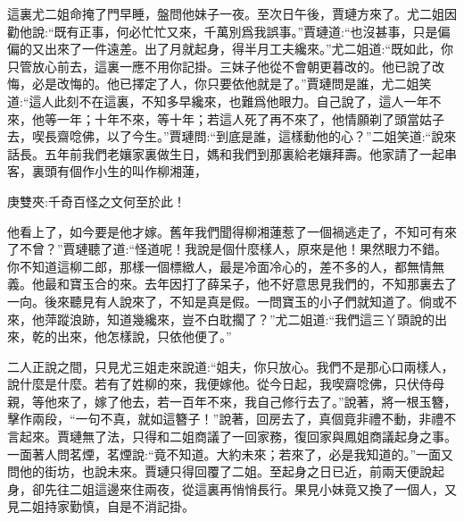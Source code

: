 \begin{parag}
    這裏尤二姐命掩了門早睡，盤問他妹子一夜。至次日午後，賈璉方來了。尤二姐因勸他說:“既有正事，何必忙忙又來，千萬別爲我誤事。”賈璉道:“也沒甚事，只是偏偏的又出來了一件遠差。出了月就起身，得半月工夫纔來。”尤二姐道:“既如此，你只管放心前去，這裏一應不用你記掛。三妹子他從不會朝更暮改的。他已說了改悔，必是改悔的。他已擇定了人，你只要依他就是了。”賈璉問是誰，尤二姐笑道:“這人此刻不在這裏，不知多早纔來，也難爲他眼力。自己說了，這人一年不來，他等一年；十年不來，等十年；若這人死了再不來了，他情願剃了頭當姑子去，喫長齋唸佛，以了今生。”賈璉問:“到底是誰，這樣動他的心？”二姐笑道:“說來話長。五年前我們老孃家裏做生日，媽和我們到那裏給老孃拜壽。他家請了一起串客，裏頭有個作小生的叫作柳湘蓮，\begin{note}庚雙夾:千奇百怪之文何至於此！\end{note}他看上了，如今要是他才嫁。舊年我們聞得柳湘蓮惹了一個禍逃走了，不知可有來了不曾？”賈璉聽了道:“怪道呢！我說是個什麼樣人，原來是他！果然眼力不錯。你不知道這柳二郎，那樣一個標緻人，最是冷面冷心的，差不多的人，都無情無義。他最和寶玉合的來。去年因打了薛呆子，他不好意思見我們的，不知那裏去了一向。後來聽見有人說來了，不知是真是假。一問寶玉的小子們就知道了。倘或不來，他萍蹤浪跡，知道幾纔來，豈不白耽擱了？”尤二姐道:“我們這三丫頭說的出來，乾的出來，他怎樣說，只依他便了。”
\end{parag}


\begin{parag}
    二人正說之間，只見尤三姐走來說道:“姐夫，你只放心。我們不是那心口兩樣人，說什麼是什麼。若有了姓柳的來，我便嫁他。從今日起，我喫齋唸佛，只伏侍母親，等他來了，嫁了他去，若一百年不來，我自己修行去了。”說著，將一根玉簪，擊作兩段，“一句不真，就如這簪子！”說著，回房去了，真個竟非禮不動，非禮不言起來。賈璉無了法，只得和二姐商議了一回家務，復回家與鳳姐商議起身之事。一面著人問茗煙，茗煙說:“竟不知道。大約未來；若來了，必是我知道的。”一面又問他的街坊，也說未來。賈璉只得回覆了二姐。至起身之日已近，前兩天便說起身，卻先往二姐這邊來住兩夜，從這裏再悄悄長行。果見小妹竟又換了一個人，又見二姐持家勤慎，自是不消記掛。
\end{parag}


